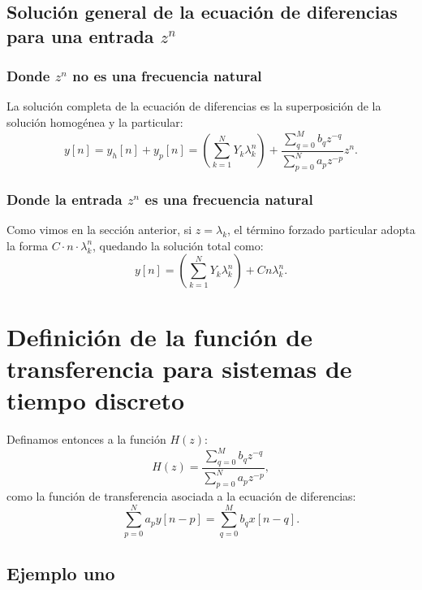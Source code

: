\subsection{Soluci\'{o}n general de la ecuaci\'{o}n de diferencias para una entrada $z^{n}$}

\subsubsection{Donde $z^{n}$ no es una frecuencia natural}

La soluci\'{o}n completa de la ecuaci\'{o}n de diferencias es la superposición de la solución homogénea y la particular:
\begin{equation}
	y[n] = y_{h}[n] + y_{p}[n] = \left(\sum_{k=1}^{N}Y_{k}\lambda_{k}^n \right) + \frac{\sum_{q=0}^{M}b_{q}z^{-q}}{\sum_{p=0}^{N}a_{p}z^{-p}} z^{n}.
\end{equation}

\subsubsection{Donde la entrada $z^{n}$ es una frecuencia natural}

Como vimos en la sección anterior, si $z = \lambda_k$, el término forzado particular adopta la forma $C \cdot n \cdot \lambda_k^n$, quedando la solución total como:
\begin{equation}
	y[n] = \left(\sum_{k=1}^{N}Y_{k}\lambda_{k}^n \right) + C n \lambda_k^{n}.
\end{equation}

\section{Definici\'{o}n de la funci\'{o}n de transferencia para sistemas de tiempo discreto}

Definamos entonces a la función $H(z)$:
\begin{equation}
	H(z) = \frac{\sum_{q=0}^{M}b_{q}z^{-q}}{\sum_{p=0}^{N}a_{p}z^{-p}}, \label{eqhzdef}
\end{equation}
como la funci\'{o}n de transferencia asociada a la ecuaci\'{o}n de diferencias:
\begin{equation}
	\sum_{p=0}^{N}a_{p} y[n-p] = \sum_{q=0}^{M}b_{q} x[n-q].
\end{equation}

\subsection{Ejemplo uno}

